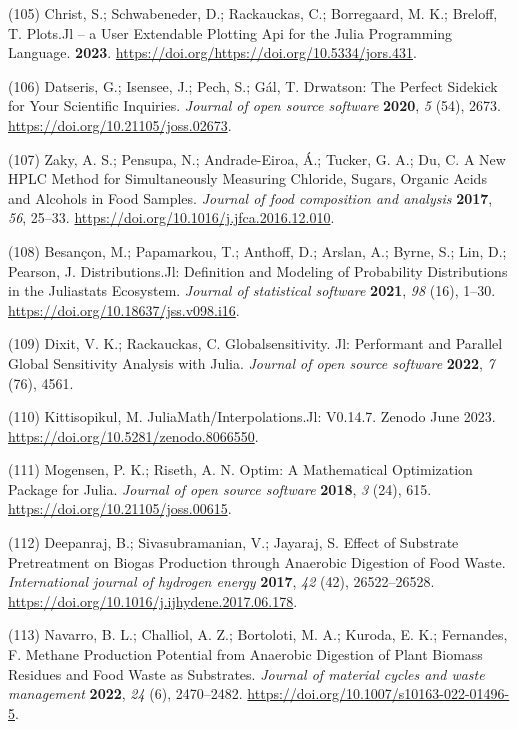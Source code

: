 \documentclass[11pt]{report}
\begin{document}
\hypertarget{citeproc_bib_item_105}{(105) Christ, S.; Schwabeneder, D.; Rackauckas, C.; Borregaard, M. K.; Breloff, T. Plots.Jl – a User Extendable Plotting Api for the Julia Programming Language. \textbf{2023}. \url{https://doi.org/https://doi.org/10.5334/jors.431}.}

\hypertarget{citeproc_bib_item_106}{(106) Datseris, G.; Isensee, J.; Pech, S.; Gál, T. Drwatson: The Perfect Sidekick for Your Scientific Inquiries. \textit{Journal of open source software} \textbf{2020}, \textit{5} (54), 2673. \url{https://doi.org/10.21105/joss.02673}.}

\hypertarget{citeproc_bib_item_107}{(107) Zaky, A. S.; Pensupa, N.; Andrade-Eiroa, Á.; Tucker, G. A.; Du, C. A New HPLC Method for Simultaneously Measuring Chloride, Sugars, Organic Acids and Alcohols in Food Samples. \textit{Journal of food composition and analysis} \textbf{2017}, \textit{56}, 25–33. \url{https://doi.org/10.1016/j.jfca.2016.12.010}.}

\hypertarget{citeproc_bib_item_108}{(108) Besançon, M.; Papamarkou, T.; Anthoff, D.; Arslan, A.; Byrne, S.; Lin, D.; Pearson, J. Distributions.Jl: Definition and Modeling of Probability Distributions in the Juliastats Ecosystem. \textit{Journal of statistical software} \textbf{2021}, \textit{98} (16), 1–30. \url{https://doi.org/10.18637/jss.v098.i16}.}

\hypertarget{citeproc_bib_item_109}{(109) Dixit, V. K.; Rackauckas, C. Globalsensitivity. Jl: Performant and Parallel Global Sensitivity Analysis with Julia. \textit{Journal of open source software} \textbf{2022}, \textit{7} (76), 4561.}

\hypertarget{citeproc_bib_item_110}{(110) Kittisopikul, M. JuliaMath/Interpolations.Jl: V0.14.7. Zenodo June 2023. \url{https://doi.org/10.5281/zenodo.8066550}.}

\hypertarget{citeproc_bib_item_111}{(111) Mogensen, P. K.; Riseth, A. N. Optim: A Mathematical Optimization Package for Julia. \textit{Journal of open source software} \textbf{2018}, \textit{3} (24), 615. \url{https://doi.org/10.21105/joss.00615}.}

\hypertarget{citeproc_bib_item_112}{(112) Deepanraj, B.; Sivasubramanian, V.; Jayaraj, S. Effect of Substrate Pretreatment on Biogas Production through Anaerobic Digestion of Food Waste. \textit{International journal of hydrogen energy} \textbf{2017}, \textit{42} (42), 26522–26528. \url{https://doi.org/10.1016/j.ijhydene.2017.06.178}.}

\hypertarget{citeproc_bib_item_113}{(113) Navarro, B. L.; Challiol, A. Z.; Bortoloti, M. A.; Kuroda, E. K.; Fernandes, F. Methane Production Potential from Anaerobic Digestion of Plant Biomass Residues and Food Waste as Substrates. \textit{Journal of material cycles and waste management} \textbf{2022}, \textit{24} (6), 2470–2482. \url{https://doi.org/10.1007/s10163-022-01496-5}.}
\end{document}
